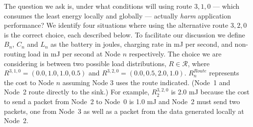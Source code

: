 \documentclass{sig-alternate}
\begin{document}
The question we ask is, under what conditions will using route $3,1,0$ ---
which consumes the least energy locally and globally --- actually
\textit{harm} application performance?  We identify four situations where
using the alternative route $3,2,0$ is the correct choice, each described
below. To facilitate our discussion we define $B_n$, $C_n$ and $L_n$ as the
battery in joules, charging rate in mJ per second, and non-routing load
in mJ per second at Node $n$ respectively. The choice we are considering
is between two possible load distributions, $R \in \mathcal{R}$, where
$R^{3,1,0} = (0.0, 1.0, 1.0, 0.5)$ and $R^{3,2,0} = (0.0, 0.5, 2.0, 1.0)$.
$R^{Route}_n$ represents the cost to Node $n$ assuming Node 3 uses the route
indicated. (Node~1 and Node~2 route directly to the sink.)  For example,
$R^{3,2,0}_2$ is 2.0 mJ because the cost to send a packet from Node~2 to
Node~0 is 1.0 mJ and Node~2 must send two packets, one from Node~3 as well as
a packet from the data generated locally at Node~2.

\vspace{0.1in}
\end{document}
